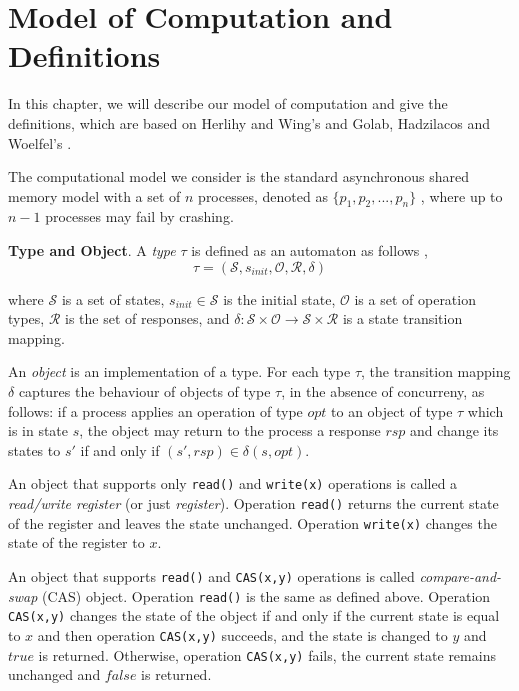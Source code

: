 
\chapter{Model of Computation and Definitions}
In this chapter, we will describe our model of computation and give the definitions, which are based on Herlihy
and Wing's \cite{Herlihy:1990:LCC:78969.78972} and Golab, Hadzilacos and Woelfel's \cite{InProc-GHHW2007a}.

The computational model we consider is the standard asynchronous shared memory model with a set of $n$ processes,
denoted as $\{p_1, p_2,...,p_n\}$ , where up to $n-1$ processes may fail by crashing.

\textbf{Type and Object}.
A \emph{type} $\tau$ is defined as an automaton as follows \cite{InProc-GHHW2007a},
$$\tau = (\mathcal{S}, s_{init},\mathcal{O},\mathcal{R} ,\delta )$$

where $\mathcal{S}$ is a set of states, $s_{init} \in \mathcal{S}$ is the initial state, $\mathcal{O}$ is a set of
operation types, $\mathcal{R}$ is the set of responses, and
$\delta :\mathcal{S} \times \mathcal{O} \to \mathcal{S} \times \mathcal{R}$ is a state transition mapping.

An \emph{object} is an implementation of a type. For each type $\tau$, the transition mapping $\delta$ captures the
behaviour of objects of type $\tau$, in the absence of concurreny,
as follows: if a process applies an operation of type $opt$ to an object of type $\tau$ which is in state $s$, the object
may return to the process a response $rsp$ and change its states to $s'$ if and only if $(s', rsp) \in \delta(s, opt)$.

An object that supports only \texttt{read()} and \texttt{write(x)} operations is called a \emph{read/write register}
(or just \emph{register}). Operation \texttt{read()} returns the current state of the register and leaves the state unchanged.
Operation \texttt{write(x)} changes the state of the register to $x$.

An object that supports \texttt{read()} and \texttt{CAS(x,y)} operations is called \emph{compare-and-swap} (CAS) object.
Operation \texttt{read()} is the same as defined above. Operation \texttt{CAS(x,y)} changes the state of
the object if and only if the current state is equal to $x$ and then operation \texttt{CAS(x,y)} succeeds, and the state is changed
to $y$ and $true$ is returned. Otherwise, operation \texttt{CAS(x,y)} fails, the current state remains unchanged and
$false$ is returned.

